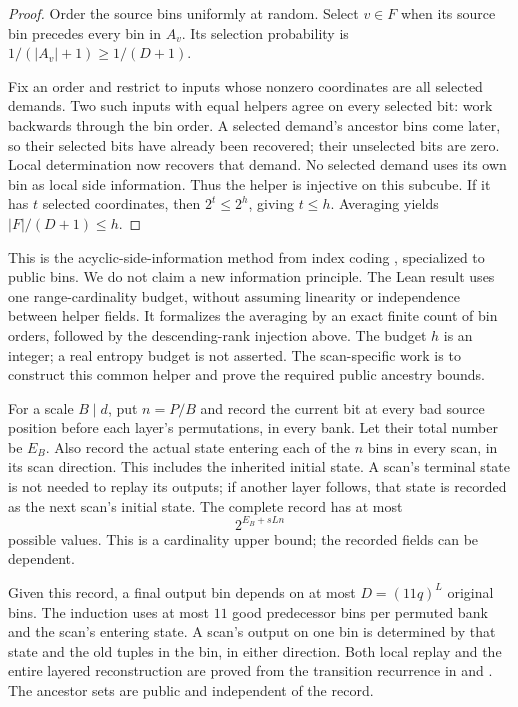\begin{proof}
Order the source bins uniformly at random. Select $v\in F$ when its
source bin precedes every bin in $A_v$. Its selection probability is
$1/(|A_v|+1)\geq1/(D+1)$.

Fix an order and restrict to inputs whose nonzero coordinates are all
selected demands. Two such inputs with equal helpers agree on every
selected bit: work backwards through the bin order. A selected demand's
ancestor bins come later, so their selected bits have already been
recovered; their unselected bits are zero. Local determination now
recovers that demand. No selected demand uses its own bin as local side information.
Thus the helper is injective on this subcube. If it has $t$ selected
coordinates, then $2^t\leq2^h$, giving $t\leq h$. Averaging yields
$|F|/(D+1)\leq h$.
\end{proof}

This is the acyclic-side-information method from index coding
\cite[Theorem~7]{BBJK2011}, specialized to public bins. We do not claim a new
information principle. The Lean result 
uses one range-cardinality budget, without assuming linearity or
independence between helper fields. It formalizes the averaging by an
exact finite count of bin orders, followed by the descending-rank
injection above. The budget $h$ is an integer; a real entropy budget is
not asserted. The scan-specific work is to construct this common helper
and prove the required public ancestry bounds.

For a scale $B\mid d$, put $n=P/B$ and record the current bit at every
bad source position before each layer's permutations, in every bank. Let their total number be
$E_B$. Also record the actual state entering each of the $n$ bins in every
scan, in its scan direction. This includes the inherited initial state.
A scan's terminal state is not needed to replay its outputs; if another
layer follows, that state is recorded as the next scan's initial state. The complete
record has at most
\begin{equation}
 \label{eq:scan-record}
                    2^{E_B+sLn}
\end{equation}
possible values. This is a cardinality upper bound; the recorded fields
can be dependent.

Given this record, a final output bin depends on at most
$D=(11q)^L$ original bins. The induction uses at most $11$ good predecessor bins per
permuted bank and the scan's entering state. A scan's output on one bin
is determined by that state and the old tuples in the bin, in either
direction. Both local replay and the entire layered reconstruction are
proved from the transition recurrence in
 and
. The ancestor sets are public
and independent of the record.


